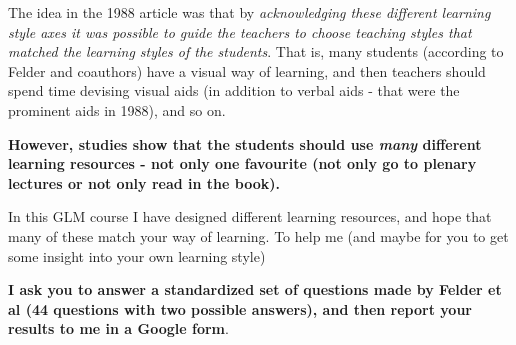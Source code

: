\documentclass[
  ignorenonframetext,
]{beamer}
\begin{document}
\begin{frame}
The idea in the 1988 article was that by \emph{acknowledging these
different learning style axes it was possible to guide the teachers to
choose teaching styles that matched the learning styles of the
students}. That is, many students (according to Felder and coauthors)
have a visual way of learning, and then teachers should spend time
devising visual aids (in addition to verbal aids - that were the
prominent aids in 1988), and so on.

\textbf{However, studies show that the students should use \emph{many}
different learning resources - not only one favourite (not only go to
plenary lectures or not only read in the book).}
\end{frame}

\begin{frame}
In this GLM course I have designed different learning resources, and
hope that many of these match your way of learning. To help me (and
maybe for you to get some insight into your own learning style)

\textbf{I ask you to answer a standardized set of questions made by
Felder et al (44 questions with two possible answers), and then report
your results to me in a Google form}.
\end{frame}
\end{document}
